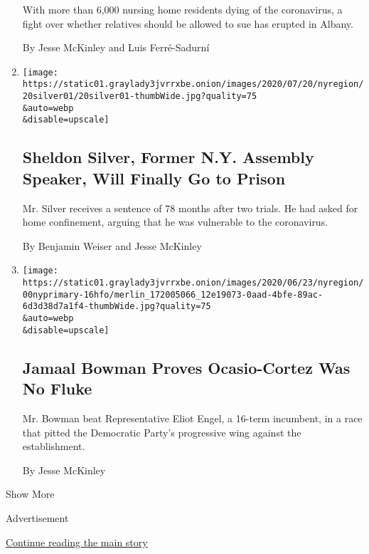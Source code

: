 \begin{enumerate}
  With more than 6,000 nursing home residents dying of the coronavirus,
  a fight over whether relatives should be allowed to sue has erupted in
  Albany.

  By Jesse McKinley and Luis Ferré-Sadurní
\item
  \href{/2020/07/20/nyregion/sheldon-silver-sentencing-prison.html}{}

  \texttt{[image: https://static01.graylady3jvrrxbe.onion/images/2020/07/20/nyregion/20silver01/20silver01-thumbWide.jpg?quality=75\\\&auto=webp\\\&disable=upscale]}

  \hypertarget{sheldon-silver-former-ny-assembly-speaker-will-finally-go-to-prison}{%
  \subsection{Sheldon Silver, Former N.Y. Assembly Speaker, Will Finally
  Go to
  Prison}\label{sheldon-silver-former-ny-assembly-speaker-will-finally-go-to-prison}}

  Mr. Silver receives a sentence of 78 months after two trials. He had
  asked for home confinement, arguing that he was vulnerable to the
  coronavirus.

  By Benjamin Weiser and Jesse McKinley
\item
  \href{/2020/07/17/nyregion/jamaal-bowman-eliot-engel.html}{}

  \texttt{[image: https://static01.graylady3jvrrxbe.onion/images/2020/06/23/nyregion/00nyprimary-16hfo/merlin\_172005066\_12e19073-0aad-4bfe-89ac-6d3d38d7a1f4-thumbWide.jpg?quality=75\\\&auto=webp\\\&disable=upscale]}

  \hypertarget{jamaal-bowman-proves-ocasio-cortez-was-no-fluke}{%
  \subsection{Jamaal Bowman Proves Ocasio-Cortez Was No
  Fluke}\label{jamaal-bowman-proves-ocasio-cortez-was-no-fluke}}

  Mr. Bowman beat Representative Eliot Engel, a 16-term incumbent, in a
  race that pitted the Democratic Party's progressive wing against the
  establishment.

  By Jesse McKinley
\end{enumerate}

Show More

Advertisement

\protect\hyperlink{after-mid2}{Continue reading the main story}

